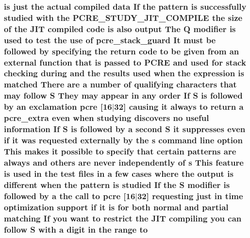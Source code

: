 \subsubsection[{\texorpdfstring{to}{to}}]{ {\bf is} just the actual {\bf compiled} {\bf data} If the {\bf pattern} {\bf is} successfully {\bf studied} {\bf with} the {\bf P\+C\+R\+E\+\_\+\+S\+T\+U\+D\+Y\+\_\+\+J\+I\+T\+\_\+\+C\+O\+M\+P\+I\+LE} the {\bf size} {\bf of} the J\+IT {\bf compiled} {\bf code} {\bf is} also {\bf output} The Q {\bf modifier} {\bf is} {\bf used} to test the use {\bf of} {\bf pcre\+\_\+stack\+\_\+guard} It must {\bf be} followed by {\bf specifying} the return {\bf code} to {\bf be} {\bf given} {\bf from} an external {\bf function} that {\bf is} passed to {\bf P\+C\+RE} and {\bf used} for {\bf stack} checking during and the {\bf results} {\bf used} when the {\bf expression} {\bf is} {\bf matched} There {\bf are} {\bf a} {\bf number} {\bf of} qualifying {\bf characters} that may follow {\bf S} They may appear {\bf in} {\bf any} {\bf order} If {\bf S} {\bf is} followed by an exclamation {\bf pcre} \mbox{[}16$\vert$32\mbox{]} causing {\bf it} always to return {\bf a} {\bf pcre\+\_\+extra} even when {\bf studying} discovers no useful information If {\bf S} {\bf is} followed by {\bf a} {\bf second} {\bf S} {\bf it} suppresses even {\bf if} {\bf it} was requested externally by the {\bf s} {\bf command} {\bf line} {\bf option} This makes {\bf it} {\bf possible} to specify that certain {\bf patterns} {\bf are} always and others {\bf are} never independently {\bf of} {\bf s} This {\bf feature} {\bf is} {\bf used} {\bf in} the test {\bf files} {\bf in} {\bf a} few {\bf cases} {\bf where} the {\bf output} {\bf is} different when the {\bf pattern} {\bf is} {\bf studied} If the {\bf S} {\bf modifier} {\bf is} followed by {\bf a} the call to {\bf pcre} \mbox{[}16$\vert$32\mbox{]} requesting just {\bf in} {\bf time} optimization {\bf support} {\bf if} {\bf it} {\bf is} for both normal and {\bf partial} {\bf matching} If you want to restrict the J\+IT {\bf compiling} you {\bf can} follow {\bf S} {\bf with} {\bf a} digit {\bf in} the range to}\hypertarget{pcretest_8txt_aa22c98f630e4b3fe86ee17ce5150c62f}{}\label{pcretest_8txt_aa22c98f630e4b3fe86ee17ce5150c62f}
